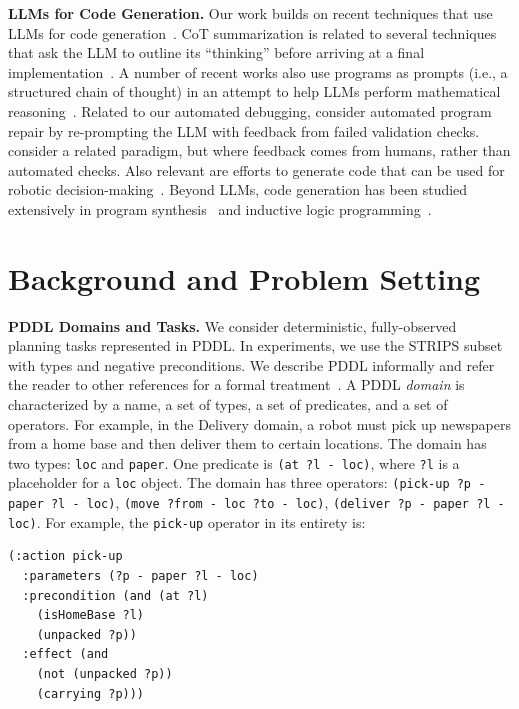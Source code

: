 \documentclass[letterpaper]{article} %
\begin{document}
\textbf{LLMs for Code Generation.}
Our work builds on recent techniques that use LLMs for code generation~\cite{chen2021evaluating,nijkamp2023codegen}.
CoT summarization is related to several techniques that ask the LLM to outline its ``thinking'' before arriving at a final implementation~\cite{wei2022chain,jiang2023self,zheng2023outline}.
A number of recent works also use programs as prompts (i.e.,  a structured chain of thought) in an attempt to help LLMs perform mathematical reasoning~\cite{gao2022pal,imani2023mathprompter}.  
Related to our automated debugging, \citet{xia2023conversational,chen2023teaching} consider automated program repair by re-prompting the LLM with feedback from failed validation checks.
\citet{chen2023improving} consider a related paradigm, but where feedback comes from humans, rather than automated checks.
Also relevant are efforts to generate code that can be used for robotic decision-making~\cite{liang2022code,singh2022progprompt}.
Beyond LLMs, code generation has been studied extensively in program synthesis~\cite{alur2013syntax,gulwani2017program} and inductive logic programming~\cite{muggleton1991inductive,cropper2022inductive}.

\section{Background and Problem Setting}

\textbf{PDDL Domains and Tasks.}
We consider deterministic, fully-observed planning tasks represented in PDDL.
In experiments, we use the STRIPS subset with types and negative preconditions.
We describe PDDL informally and refer the reader to other references for a formal treatment~\cite{mcdermott-aimag2000}.
A PDDL \emph{domain} is characterized by a name, a set of types, a set of predicates, and a set of operators.
For example, in the Delivery domain, a robot must pick up newspapers from a home base and then deliver them to certain locations.
The domain has two types: \texttt{loc} and \texttt{paper}.
One predicate is \texttt{(at ?l - loc)}, where \texttt{?l} is a placeholder for a \texttt{loc} object.
The domain has three operators: \texttt{(pick-up ?p - paper ?l - loc)}, \texttt{(move ?from - loc ?to - loc)}, \texttt{(deliver ?p - paper ?l - loc)}.
For example, the \texttt{pick-up} operator in its entirety is:
{\footnotesize
\begin{verbatim}
(:action pick-up
  :parameters (?p - paper ?l - loc)
  :precondition (and (at ?l)
    (isHomeBase ?l)
    (unpacked ?p))
  :effect (and
    (not (unpacked ?p))
    (carrying ?p)))
\end{verbatim}
}
\end{document}
